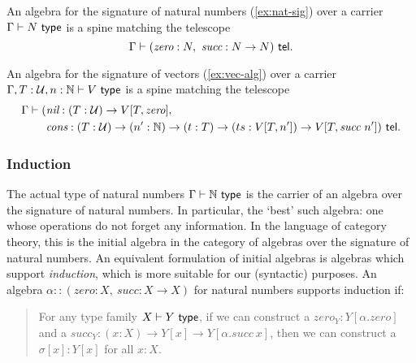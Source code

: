 \begin{example}\label{ex:nat-alg}
An algebra for the signature of natural numbers (\cref{ex:nat-sig}) over a carrier $\Gamma \vdash N \ \textsf{type}$ is a spine matching
the telescope \[\Gamma \vdash (\textit{zero}: N,\ \textit{succ}: N \to N) \ \textsf{tel}.\]
\end{example}

\begin{example}[Vectors]\label{ex:vec-alg}
An algebra for the signature of vectors (\cref{ex:vec-alg}) over a carrier $\Gamma, T : \mathcal{U}, n : \mathbb{N} \vdash V \ \textsf{type}$ is a spine matching
the telescope
\begin{align*}
 \Gamma \vdash (&\textit{nil} : (T : \mathcal{U}) \to V[T, \textit{zero}], \\
&\textit{cons} : (T : \mathcal{U}) \to (n' : \mathbb{N}) \to (t : T) \to (ts : V[T,n']) \to V[T, \textit{succ}\ n']) \ \textsf{tel}.
\end{align*}
\end{example}

\subsubsection{Induction}

The actual type of natural numbers $\Gamma \vdash \mathbb{N} \ \textsf{type}$ is the
carrier of an algebra over the signature of natural numbers. In particular, the
`best' such algebra: one whose operations do not forget any information. In the
language of category theory, this is the initial algebra in the category of
algebras over the signature of natural numbers. An equivalent formulation of
initial algebras is algebras which support \emph{induction}, which is more
suitable for our (syntactic) purposes. An algebra $\alpha :: (\textit{zero}: X,\
\textit{succ}: X \to X)$ for natural numbers supports induction if:

\begin{quote}
For any type family $X \vdash Y \ \textsf{type}$, if we can construct a $\textit{zero}_Y :
Y[\alpha.\textit{zero}]$ and a $\textit{succ}_Y : (x : X) \to Y[x] \to
Y[\alpha.\textit{succ}\ x]$, then we can construct a $\sigma[x] : Y[x]$ for all
$x : X$.
\end{quote}


